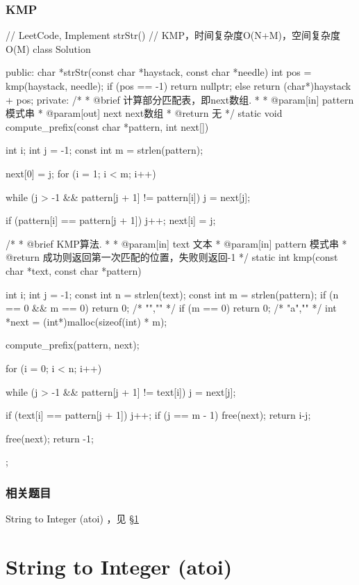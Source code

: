 \subsubsection{KMP}
\begin{Code}
// LeetCode, Implement strStr()
// KMP，时间复杂度O(N+M)，空间复杂度O(M)
class Solution {
public:
    char *strStr(const char *haystack, const char *needle) {
        int pos = kmp(haystack, needle);
        if (pos == -1) return nullptr;
        else return (char*)haystack + pos;
    }
private:
    /*
     * @brief 计算部分匹配表，即next数组.
     *
     * @param[in] pattern 模式串
     * @param[out] next next数组
     * @return 无
     */
    static void compute_prefix(const char *pattern, int next[]) {
        int i;
        int j = -1;
        const int m = strlen(pattern);

        next[0] = j;
        for (i = 1; i < m; i++) {
            while (j > -1 && pattern[j + 1] != pattern[i]) j = next[j];

            if (pattern[i] == pattern[j + 1]) j++;
            next[i] = j;
        }
    }

    /*
     * @brief KMP算法.
     *
     * @param[in] text 文本
     * @param[in] pattern 模式串
     * @return 成功则返回第一次匹配的位置，失败则返回-1
     */
    static int kmp(const char *text, const char *pattern) {
        int i;
        int j = -1;
        const int n = strlen(text);
        const int m = strlen(pattern);
        if (n == 0 && m == 0) return 0; /* "","" */
        if (m == 0) return 0;  /* "a","" */
        int *next = (int*)malloc(sizeof(int) * m);

        compute_prefix(pattern, next);

        for (i = 0; i < n; i++) {
            while (j > -1 && pattern[j + 1] != text[i]) j = next[j];

            if (text[i] == pattern[j + 1]) j++;
            if (j == m - 1) {
                free(next);
                return i-j;
            }
        }

        free(next);
        return -1;
    }
};
\end{Code}


\subsubsection{相关题目}
\begindot
\item String to Integer (atoi) ，见 \S \ref{sec:string-to-integer}
\myenddot


\section{String to Integer (atoi)} %
\label{sec:string-to-integer}


